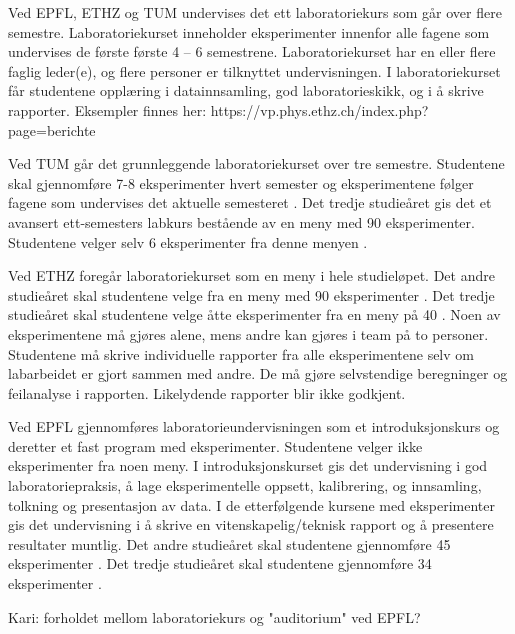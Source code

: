 \documentclass{article}
\begin{document}
Ved EPFL, ETHZ og TUM undervises det ett laboratoriekurs som går over flere semestre. Laboratoriekurset inneholder eksperimenter innenfor alle fagene som undervises de første første 4 – 6 semestrene. Laboratoriekurset har en eller flere faglig leder(e), og flere personer er tilknyttet undervisningen. I laboratoriekurset får studentene opplæring i datainnsamling, god laboratorieskikk, og i å skrive rapporter. Eksempler finnes her: https://vp.phys.ethz.ch/index.php?page=berichte

Ved TUM går det grunnleggende laboratoriekurset over tre semestre. Studentene skal gjennomføre 7-8 eksperimenter hvert semester og eksperimentene følger fagene som undervises det aktuelle semesteret \cite{TUMpraktikum1}. Det tredje studieåret gis det et avansert ett-semesters labkurs bestående av en meny med 90 eksperimenter. Studentene velger selv 6 eksperimenter fra denne menyen \cite{TUMpraktikum2}. 


Ved ETHZ foregår laboratoriekurset som en meny i hele studieløpet. Det andre studieåret skal studentene velge fra en meny med 90 eksperimenter \cite{ETHZ_90}.  Det tredje studieåret skal studentene velge åtte eksperimenter fra en meny på 40 \cite{ETHZ_40}. Noen av eksperimentene må gjøres alene, mens andre kan gjøres i team på to personer. Studentene må skrive individuelle rapporter fra alle eksperimentene selv om labarbeidet er gjort sammen med andre. De må gjøre selvstendige beregninger og feilanalyse i rapporten. Likelydende rapporter blir ikke godkjent. 



Ved EPFL gjennomføres laboratorieundervisningen som et introduksjonskurs og deretter et fast program med eksperimenter. Studentene velger ikke eksperimenter fra noen meny. I introduksjonskurset gis det undervisning i god laboratoriepraksis, å lage eksperimentelle oppsett, kalibrering, og innsamling, tolkning og presentasjon av data. I de etterfølgende kursene med eksperimenter gis det undervisning i å skrive en vitenskapelig/teknisk rapport og å presentere resultater muntlig. 
Det andre studieåret skal studentene gjennomføre 45 eksperimenter \cite{EPFL_45}. Det tredje studieåret skal studentene gjennomføre 34 eksperimenter \cite{EPFL_34}. 

{\color{red} Kari: forholdet mellom laboratoriekurs og "auditorium" ved EPFL? }
\end{document}
